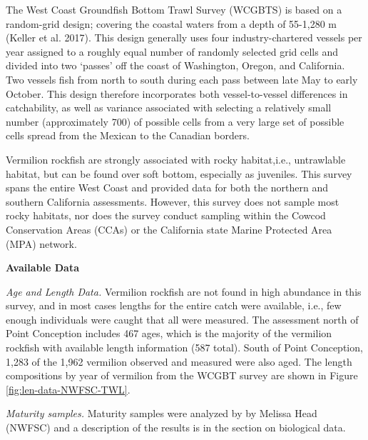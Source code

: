 \documentclass[11pt,
  english,
  a4paper,
]{article}
\begin{document}
\leavevmode\tagmcend\tagstructend

The West Coast Groundfish Bottom Trawl Survey (WCGBTS) is based on a random-grid design; covering the coastal waters from a depth of 55-1,280 m {(Keller et al. 2017)\leavevmode\tagmcend\tagstructend}. This design generally uses four industry-chartered vessels per year assigned to a roughly equal number of randomly selected grid cells and divided into two `passes' off the coast of Washington, Oregon, and California. Two vessels fish from north to south during each pass between late May to early October. This design therefore incorporates both vessel-to-vessel differences in catchability, as well as variance associated with selecting a relatively small number (approximately 700) of possible cells from a very large set of possible cells spread from the Mexican to the Canadian borders.

Vermilion rockfish are strongly associated with rocky habitat,i.e., untrawlable habitat, but can be found over soft bottom, especially as juveniles. This survey spans the entire West Coast and provided data for both the northern and southern California assessments. However, this survey does not sample most rocky habitats, nor does the survey conduct sampling within the Cowcod Conservation Areas (CCAs) or the California state Marine Protected Area (MPA) network.

\textbf{Available Data}

\emph{Age and Length Data.} Vermilion rockfish are not found in high abundance in this survey, and in most cases lengths for the entire catch were available, i.e., few enough individuals were caught that all were measured. The assessment north of Point Conception includes 467 ages, which is the majority of the vermilion rockfish with available length information (587 total). South of Point Conception, 1,283 of the 1,962 vermilion observed and measured were also aged. The length compositions by year of vermilion from the WCGBT survey are shown in Figure \ref{fig:len-data-NWFSC-TWL}.

\emph{Maturity samples.} Maturity samples were analyzed by by Melissa Head (NWFSC) and a description of the results is in the section on biological data.
\end{document}
